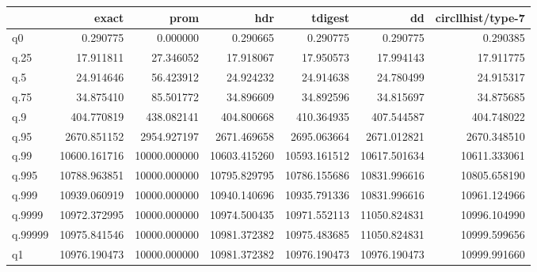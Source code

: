 \begin{tabular}{lrrrrrr}
\toprule
{} &         exact &          prom &           hdr &       tdigest &            dd &  circllhist/type-7 \\
\midrule
q0      &      0.290775 &      0.000000 &      0.290665 &      0.290775 &      0.290775 &           0.290385 \\
q.25    &     17.911811 &     27.346052 &     17.918067 &     17.950573 &     17.994143 &          17.911775 \\
q.5     &     24.914646 &     56.423912 &     24.924232 &     24.914638 &     24.780499 &          24.915317 \\
q.75    &     34.875410 &     85.501772 &     34.896609 &     34.892596 &     34.815697 &          34.875685 \\
q.9     &    404.770819 &    438.082141 &    404.800668 &    410.364935 &    407.544587 &         404.748022 \\
q.95    &   2670.851152 &   2954.927197 &   2671.469658 &   2695.063664 &   2671.012821 &        2670.348510 \\
q.99    &  10600.161716 &  10000.000000 &  10603.415260 &  10593.161512 &  10617.501634 &       10611.333061 \\
q.995   &  10788.963851 &  10000.000000 &  10795.829795 &  10786.155686 &  10831.996616 &       10805.658190 \\
q.999   &  10939.060919 &  10000.000000 &  10940.140696 &  10935.791336 &  10831.996616 &       10961.124966 \\
q.9999  &  10972.372995 &  10000.000000 &  10974.500435 &  10971.552113 &  11050.824831 &       10996.104990 \\
q.99999 &  10975.841546 &  10000.000000 &  10981.372382 &  10975.483685 &  11050.824831 &       10999.599656 \\
q1      &  10976.190473 &  10000.000000 &  10981.372382 &  10976.190473 &  10976.190473 &       10999.991660 \\
\bottomrule
\end{tabular}
